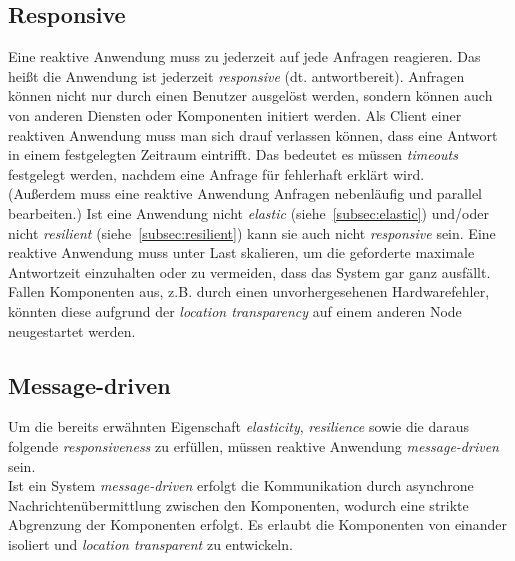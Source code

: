 \subsection{Responsive}\label{subsec:responsive}
Eine reaktive Anwendung muss zu jederzeit auf jede Anfragen reagieren. Das heißt die Anwendung ist jederzeit \textit{responsive} (dt. antwortbereit). Anfragen können nicht nur durch einen Benutzer ausgelöst werden, sondern können auch von anderen Diensten oder Komponenten initiert werden. Als Client einer reaktiven Anwendung muss man sich drauf verlassen können, dass eine Antwort in einem festgelegten Zeitraum eintrifft. Das bedeutet es müssen \textit{timeouts} festgelegt werden, nachdem eine Anfrage für fehlerhaft erklärt wird.\\
(Außerdem muss eine reaktive Anwendung Anfragen nebenläufig und parallel bearbeiten.)
Ist eine Anwendung nicht \textit{elastic} (siehe~\ref{subsec:elastic}) und/oder nicht \textit{resilient} (siehe~\ref{subsec:resilient}) kann sie auch nicht \textit{responsive} sein. Eine reaktive Anwendung muss unter Last skalieren, um die geforderte maximale Antwortzeit einzuhalten oder zu vermeiden, dass das System gar ganz ausfällt. Fallen Komponenten aus, z.B. durch einen unvorhergesehenen Hardwarefehler, könnten diese aufgrund der \textit{location transparency} auf einem anderen Node neugestartet werden.

\pagebreak

\subsection{Message-driven}\label{subsec:messagedriven}
Um die bereits erwähnten Eigenschaft \textit{elasticity}, \textit{resilience} sowie die daraus folgende \textit{responsiveness} zu erfüllen, müssen reaktive Anwendung \textit{message-driven} sein.\\
Ist ein System \textit{message-driven} erfolgt die Kommunikation durch asynchrone Nachrichtenübermittlung zwischen den Komponenten, wodurch eine strikte Abgrenzung der Komponenten erfolgt. Es erlaubt die Komponenten von einander isoliert und \textit{location transparent} zu entwickeln.


